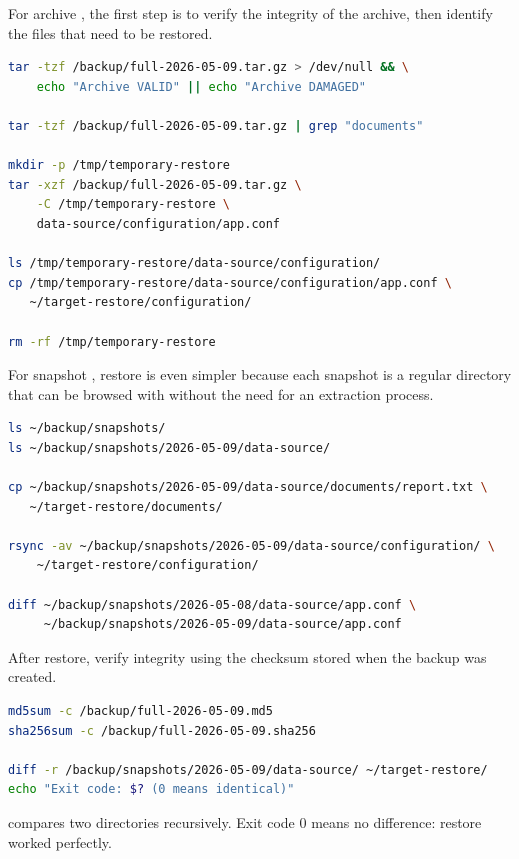 For archive , the first step is to verify the integrity of the archive, then identify the files that need to be restored.

\begin{lstlisting}[language=bash, caption={Restore from tar archive with verification}]
tar -tzf /backup/full-2026-05-09.tar.gz > /dev/null && \
    echo "Archive VALID" || echo "Archive DAMAGED"

tar -tzf /backup/full-2026-05-09.tar.gz | grep "documents"

mkdir -p /tmp/temporary-restore
tar -xzf /backup/full-2026-05-09.tar.gz \
    -C /tmp/temporary-restore \
    data-source/configuration/app.conf

ls /tmp/temporary-restore/data-source/configuration/
cp /tmp/temporary-restore/data-source/configuration/app.conf \
   ~/target-restore/configuration/

rm -rf /tmp/temporary-restore
\end{lstlisting}

For snapshot , restore is even simpler because each snapshot is a regular directory that can be browsed with  without the need for an extraction process.

\begin{lstlisting}[language=bash, caption={Restore from rsync snapshot}]
ls ~/backup/snapshots/
ls ~/backup/snapshots/2026-05-09/data-source/

cp ~/backup/snapshots/2026-05-09/data-source/documents/report.txt \
   ~/target-restore/documents/

rsync -av ~/backup/snapshots/2026-05-09/data-source/configuration/ \
    ~/target-restore/configuration/

diff ~/backup/snapshots/2026-05-08/data-source/app.conf \
     ~/backup/snapshots/2026-05-09/data-source/app.conf
\end{lstlisting}

After restore, verify integrity using the checksum stored when the backup was created.

\begin{lstlisting}[language=bash, caption={Verify integrity after restore}]
md5sum -c /backup/full-2026-05-09.md5
sha256sum -c /backup/full-2026-05-09.sha256

diff -r /backup/snapshots/2026-05-09/data-source/ ~/target-restore/
echo "Exit code: $? (0 means identical)"
\end{lstlisting}

\cmd{diff -r} compares two directories recursively. Exit code 0 means
no difference: restore worked perfectly.

